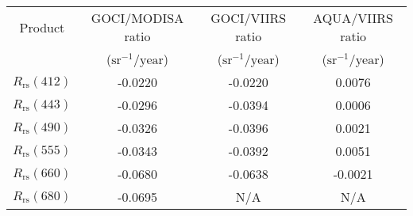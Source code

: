 \documentclass[preview]{standalone}
\begin{document}
\begin{threeparttable}

\centering
\begin{tabular}{cccc} 
 \hline 

Product & GOCI/MODISA ratio & GOCI/VIIRS ratio & AQUA/VIIRS ratio \\ 
& ($\text{sr}^{-1}/\text{year}$)	& ($\text{sr}^{-1}/\text{year}$)	& ($\text{sr}^{-1}/\text{year}$) 	\\ \hline
$R_\text{rs}(412)$ & -0.0220 & -0.0220 & 0.0076 \\
$R_\text{rs}(443)$ & -0.0296 & -0.0394 & 0.0006 \\
$R_\text{rs}(490)$ & -0.0326 & -0.0396 & 0.0021 \\
$R_\text{rs}(555)$ & -0.0343 & -0.0392 & 0.0051 \\
$R_\text{rs}(660)$ & -0.0680 & -0.0638 &-0.0021\\
$R_\text{rs}(680)$ & -0.0695 & N/A 				& N/A 				\\


\hline 
\end{tabular}

\end{threeparttable}
\end{document}
